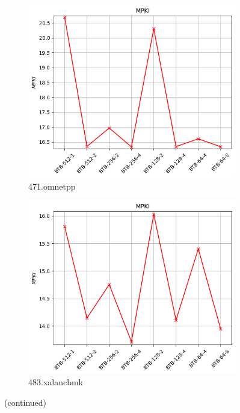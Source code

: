 \documentclass{article}
\begin{document}
\begin{figure}[H]
    \vspace{0.5cm} %

    \begin{subfigure}[b]{0.45\textwidth}
        \includegraphics[width=\textwidth]{figures/5_4/471.omnetpp.cslab_branch_preds_ref.out.png}
        \caption{471.omnetpp}
        \label{fig:plot63}
    \end{subfigure}
    \hfill
    \begin{subfigure}[b]{0.45\textwidth}
        \includegraphics[width=\textwidth]{figures/5_4/483.xalancbmk.cslab_branch_preds_ref.out.png}
        \caption{483.xalancbmk}
        \label{fig:plot64}
    \end{subfigure}
    
    \vspace{0.5cm} %

    \caption{(continued)}
    \label{fig:btb_part3}
\end{figure}
\end{document}
